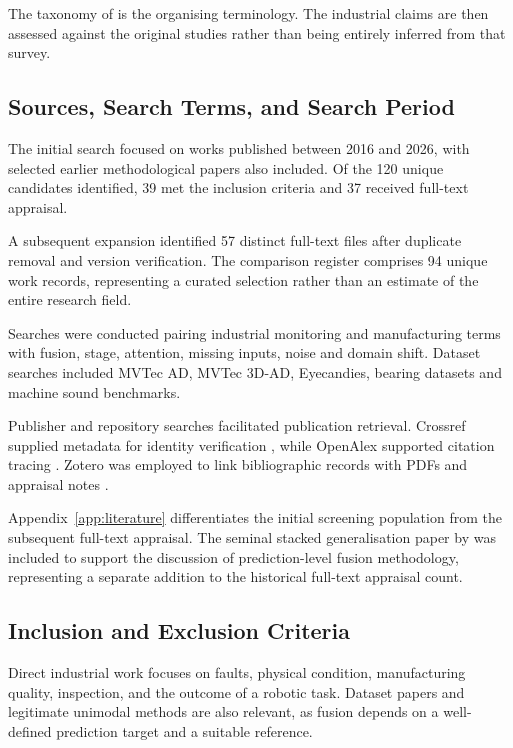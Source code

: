 The taxonomy of \textcite{Baltrusaitis2019Multimodal} is the organising terminology. The industrial claims are then assessed against the original
studies rather than being entirely inferred from that survey.

\subsection{Sources, Search Terms, and Search Period}

The initial search focused on works published between 2016 and 2026, with selected earlier
methodological papers also included. Of the 120 unique candidates identified, 39 met the
inclusion criteria and 37 received full-text appraisal.

A subsequent expansion identified 57 distinct full-text files after duplicate removal and version
verification. The comparison register comprises 94 unique work records, representing a curated
selection rather than an estimate of the entire research field.

Searches were conducted pairing industrial monitoring and manufacturing terms with fusion, stage,
attention, missing inputs, noise and domain shift. Dataset searches included MVTec AD, MVTec 3D-AD,
Eyecandies, bearing datasets and machine sound benchmarks.

Publisher and repository searches facilitated publication retrieval. Crossref supplied metadata for
identity verification \parencite{Crossref2020REST}, while OpenAlex supported citation tracing
\parencite{Priem2022OpenAlex}. Zotero was employed to link bibliographic records with PDFs and appraisal
notes \parencite{Zotero2026}.

Appendix~\ref{app:literature} differentiates the initial screening population from the subsequent
full-text appraisal. The seminal stacked generalisation paper by \textcite{Ting1999Issues} was included
to support the discussion of prediction-level fusion methodology,
representing a separate addition to the historical full-text appraisal count.

\subsection{Inclusion and Exclusion Criteria}

Direct industrial work focuses on faults, physical condition, manufacturing quality, inspection, and
the outcome of a robotic task. Dataset papers and legitimate unimodal methods are also relevant, as
fusion depends on a well-defined prediction target and a suitable reference.

